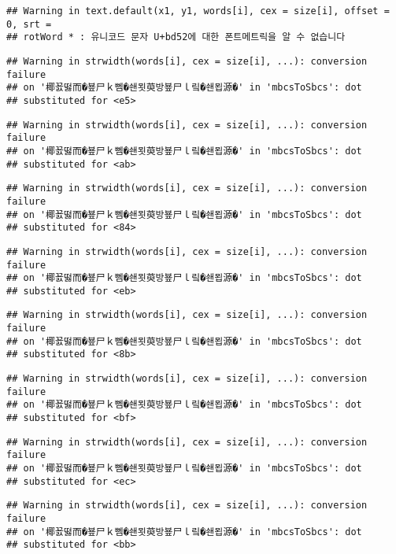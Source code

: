 \documentclass[]{article}
\begin{document}
\begin{verbatim}
## Warning in text.default(x1, y1, words[i], cex = size[i], offset = 0, srt =
## rotWord * : 유니코드 문자 U+bd52에 대한 폰트메트릭을 알 수 없습니다
\end{verbatim}

\begin{verbatim}
## Warning in strwidth(words[i], cex = size[i], ...): conversion failure
## on '椰꾨떯而�뵾尸ｋ뻼�쇈묏萸방뵾尸ｌ맄�쇈묍源�' in 'mbcsToSbcs': dot
## substituted for <e5>
\end{verbatim}

\begin{verbatim}
## Warning in strwidth(words[i], cex = size[i], ...): conversion failure
## on '椰꾨떯而�뵾尸ｋ뻼�쇈묏萸방뵾尸ｌ맄�쇈묍源�' in 'mbcsToSbcs': dot
## substituted for <ab>
\end{verbatim}

\begin{verbatim}
## Warning in strwidth(words[i], cex = size[i], ...): conversion failure
## on '椰꾨떯而�뵾尸ｋ뻼�쇈묏萸방뵾尸ｌ맄�쇈묍源�' in 'mbcsToSbcs': dot
## substituted for <84>
\end{verbatim}

\begin{verbatim}
## Warning in strwidth(words[i], cex = size[i], ...): conversion failure
## on '椰꾨떯而�뵾尸ｋ뻼�쇈묏萸방뵾尸ｌ맄�쇈묍源�' in 'mbcsToSbcs': dot
## substituted for <eb>
\end{verbatim}

\begin{verbatim}
## Warning in strwidth(words[i], cex = size[i], ...): conversion failure
## on '椰꾨떯而�뵾尸ｋ뻼�쇈묏萸방뵾尸ｌ맄�쇈묍源�' in 'mbcsToSbcs': dot
## substituted for <8b>
\end{verbatim}

\begin{verbatim}
## Warning in strwidth(words[i], cex = size[i], ...): conversion failure
## on '椰꾨떯而�뵾尸ｋ뻼�쇈묏萸방뵾尸ｌ맄�쇈묍源�' in 'mbcsToSbcs': dot
## substituted for <bf>
\end{verbatim}

\begin{verbatim}
## Warning in strwidth(words[i], cex = size[i], ...): conversion failure
## on '椰꾨떯而�뵾尸ｋ뻼�쇈묏萸방뵾尸ｌ맄�쇈묍源�' in 'mbcsToSbcs': dot
## substituted for <ec>
\end{verbatim}

\begin{verbatim}
## Warning in strwidth(words[i], cex = size[i], ...): conversion failure
## on '椰꾨떯而�뵾尸ｋ뻼�쇈묏萸방뵾尸ｌ맄�쇈묍源�' in 'mbcsToSbcs': dot
## substituted for <bb>
\end{verbatim}
\end{document}
